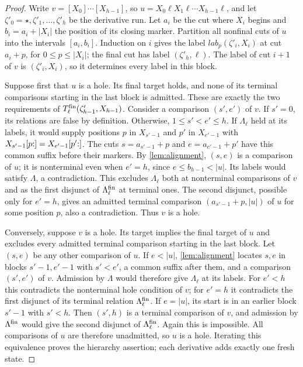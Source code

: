 \begin{proof}
Write $v=[X_0]\cdots[X_{h-1}]$, so
$u=X_0\ell X_1\ell\cdots X_{h-1}\ell$, and let
$\zeta'_0=\star,\zeta'_1,\ldots,\zeta'_h$ be the derivative run.
Let $a_i$ be the cut where $X_i$ begins and $b_i=a_i+|X_i|$ the
position of its closing marker. Partition all nonfinal cuts of $u$ into
the intervals $[a_i,b_i]$. Induction on $i$ gives the label
$\mathit{lab}_p(\zeta'_i,X_i)$ at cut $a_i+p$, for $0\le p\le|X_i|$;
the final cut has label $(\zeta'_h,\ell)$. The label of cut $i+1$ of $v$
is $(\zeta'_i,X_i)$, so it determines every label in this block.

Suppose first that $u$ is a hole. Its final target holds, and none of
its terminal comparisons starting in the last block is admitted. These
are exactly the two requirements of $T^{\mathrm{fin}}_\ell(\zeta'_{h-1},X_{h-1})$.
Consider a comparison $(s',e')$ of $v$. If $s'=0$, its relations are false
by definition. Otherwise, $1\le s'<e'\le h$. If $\Lambda_\ell$ held at its
labels, it would supply positions $p$ in $X_{s'-1}$ and $p'$ in $X_{e'-1}$
with $X_{s'-1}[p{:}]=X_{e'-1}[p'{:}]$.
The cuts $s=a_{s'-1}+p$ and $e=a_{e'-1}+p'$ have this common
suffix before their markers. By \cref{lem:alignment}, $(s,e)$ is
a comparison of $u$; it is nonterminal even when $e'=h$, since
$e\le b_{h-1}<|u|$. Its labels would satisfy $\Lambda$, a contradiction.
This excludes $\Lambda_\ell$ both at nonterminal comparisons of $v$
and as the first disjunct of $\Lambda^{\mathrm{fin}}_\ell$ at terminal ones.
The second disjunct, possible only for $e'=h$, gives an admitted terminal
comparison $(a_{s'-1}+p,|u|)$ of $u$ for some position $p$, also a
contradiction. Thus $v$ is a hole.

Conversely, suppose $v$ is a hole. Its target implies the final target
of $u$ and excludes every admitted terminal comparison starting in the
last block. Let $(s,e)$ be any other comparison of $u$. If $e<|u|$,
\cref{lem:alignment} locates $s,e$ in blocks $s'-1,e'-1$ with $s'<e'$,
a common suffix after them, and a comparison $(s',e')$ of $v$.
Admission by $\Lambda$ would therefore give $\Lambda_\ell$ at its labels.
For $e'<h$ this contradicts the nonterminal hole condition of $v$;
for $e'=h$ it contradicts the first disjunct of its terminal relation
$\Lambda^{\mathrm{fin}}_\ell$. If $e=|u|$, its start is in an earlier block $s'-1$
with $s'<h$. Then $(s',h)$ is a terminal comparison of $v$, and admission
by $\Lambda^{\mathrm{fin}}$ would give the second disjunct of $\Lambda^{\mathrm{fin}}_\ell$.
Again this is impossible. All comparisons of $u$ are therefore unadmitted,
so $u$ is a hole. Iterating this equivalence proves the hierarchy assertion;
each derivative adds exactly one fresh state.
\end{proof}



